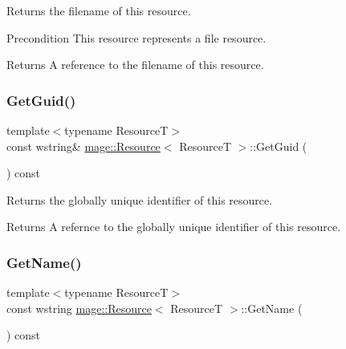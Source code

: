 Returns the filename of this resource.

\begin{DoxyPrecond}{Precondition}
This resource represents a file resource. 
\end{DoxyPrecond}
\begin{DoxyReturn}{Returns}
A reference to the filename of this resource. 
\end{DoxyReturn}
\hypertarget{classmage_1_1_resource_adaa2464cb1fdb51a3f6028c0f316d083}{}\label{classmage_1_1_resource_adaa2464cb1fdb51a3f6028c0f316d083} 
\subsubsection{\texorpdfstring{Get\+Guid()}{GetGuid()}}
{\footnotesize\ttfamily template$<$typename ResourceT$>$ \\
const wstring\& \hyperlink{classmage_1_1_resource}{mage\+::\+Resource}$<$ ResourceT $>$\+::Get\+Guid (\begin{DoxyParamCaption}{ }\end{DoxyParamCaption}) const\hspace{0.3cm}{\ttfamily [noexcept]}}

Returns the globally unique identifier of this resource.

\begin{DoxyReturn}{Returns}
A refernce to the globally unique identifier of this resource. 
\end{DoxyReturn}
\hypertarget{classmage_1_1_resource_a7e056c97f70a3f7211d9456bbda51010}{}\label{classmage_1_1_resource_a7e056c97f70a3f7211d9456bbda51010} 
\subsubsection{\texorpdfstring{Get\+Name()}{GetName()}}
{\footnotesize\ttfamily template$<$typename ResourceT$>$ \\
const wstring \hyperlink{classmage_1_1_resource}{mage\+::\+Resource}$<$ ResourceT $>$\+::Get\+Name (\begin{DoxyParamCaption}{ }\end{DoxyParamCaption}) const\hspace{0.3cm}{\ttfamily [noexcept]}}

